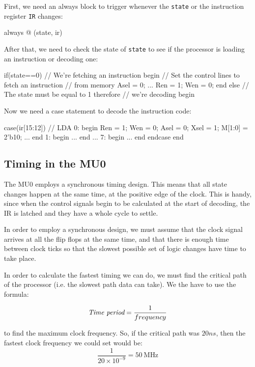 First, we need an always block to trigger whenever the {\tt state} or the
instruction register {\tt IR} changes:

\begin{listing}{1}
always @ (state, ir)
\end{listing}

After that, we need to check the state of {\tt state} to see if the processor is
loading an instruction or decoding one:

\begin{listingcont}
	if(state==0)	// We're fetching an instruction
		begin
		// Set the control lines to fetch an instruction
		// from memory
		Asel = 0;
		...
		Ren = 1;
		Wen = 0;
		end
	else 		// The state must be equal to 1 therefore
				// we're decoding
		begin
\end{listingcont}

Now we need a case statement to decode the instruction code:

\begin{listingcont}
	case(ir[15:12])
		// LDA
		0: 	begin
			Ren = 1;
			Wen = 0;
			Asel = 0;
			Xsel = 1;
			M[1:0] = 2'b10;
			...
			end
		1:	begin
			...
			end
		...
		7:	begin
			...
			end
	endcase
end
\end{listingcont}

\subsection{Timing in the MU0}

The MU0 employs a synchronous timing design. This means that all state changes
happen at the same time, at the positive edge of the clock. This is handy, since
when the control signals begin to be calculated at the start of decoding, the IR
is latched and they have a whole cycle to settle.

In order to employ a synchronous design, we must assume that the clock signal
arrives at all the flip flops at the same time, and that there is enough time
between clock ticks so that the slowest possible set of logic changes have time
to take place.

In order to calculate the fastest timing we can do, we must find the critical
path of the processor (i.e. the slowest path data can take). We the have to use
the formula:

\[
	\textrm{\it Time period} = \frac{1}{frequency}
\]

to find the maximum clock frequency. So, if the critical path was $20ns$, then
the fastest clock frequency we could set would be:
\[
	\frac{1}{20\times10^{-9}} = \SI{50}{\mega\hertz}
\]

